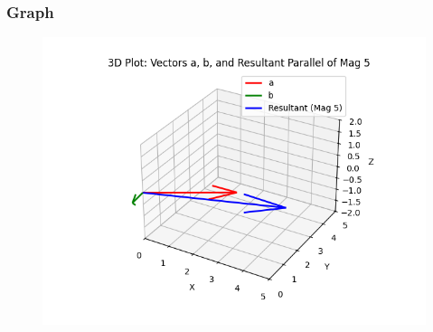 \documentclass{beamer}
\begin{document}
\begin{frame}[fragile]
\frametitle{Graph}

\begin{figure}[H]
\begin{center}
\includegraphics[width=0.75\columnwidth]{../figs/graph.png}
\end{center}
\caption{}
\label{fig:Fig}
\end{figure}




\end{frame}
\end{document}

